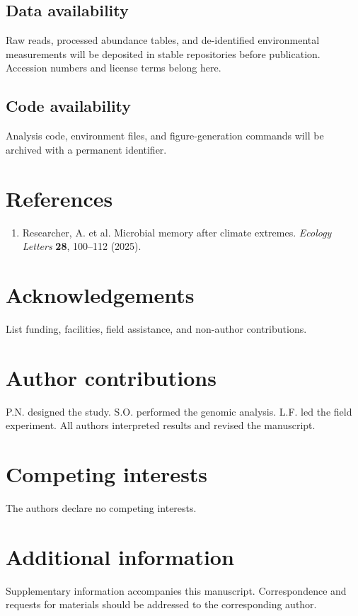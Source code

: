 \documentclass[12pt]{article}
\begin{document}
\subsection*{Data availability}
Raw reads, processed abundance tables, and de-identified environmental
measurements will be deposited in stable repositories before publication.
Accession numbers and license terms belong here.

\subsection*{Code availability}
Analysis code, environment files, and figure-generation commands will be
archived with a permanent identifier.

\section*{References}
\begin{enumerate}
\item Researcher, A. et al. Microbial memory after climate extremes.
\textit{Ecology Letters} \textbf{28}, 100--112 (2025).
\end{enumerate}

\section*{Acknowledgements}
List funding, facilities, field assistance, and non-author contributions.

\section*{Author contributions}
P.N. designed the study. S.O. performed the genomic analysis. L.F. led the
field experiment. All authors interpreted results and revised the manuscript.

\section*{Competing interests}
The authors declare no competing interests.

\section*{Additional information}
Supplementary information accompanies this manuscript. Correspondence and
requests for materials should be addressed to the corresponding author.
\end{document}
